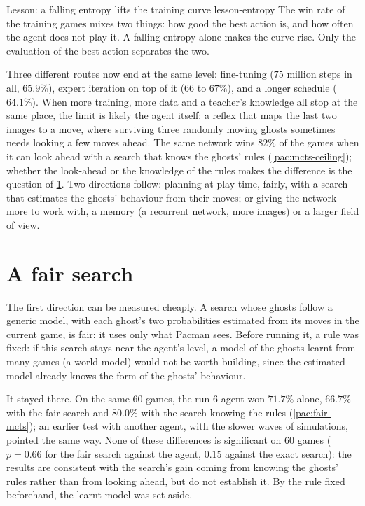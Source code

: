 \begin{remark}{Lesson: a falling entropy lifts the training curve}%
  {lesson-entropy}
  The win rate of the training games mixes two things: how good the best
  action is, and how often the agent does not play it. A falling entropy
  alone makes the curve rise. Only the evaluation of the best action
  separates the two.
\end{remark}

Three different routes now end at the same level: fine-tuning ($75$ million
steps in all, $65.9\%$), expert iteration on top of it ($66$ to $67\%$), and a
longer schedule ($64.1\%$). When more training, more data and a teacher's
knowledge all stop at the same place, the limit is likely the agent itself:
a reflex that maps the last two images to a move, where surviving three
randomly moving ghosts sometimes needs looking a few moves ahead. The same
network wins $82\%$ of the games when it can look ahead with a search
that knows the ghosts' rules (\cref{pac:mcts-ceiling}); whether the
look-ahead or the knowledge of the rules makes the difference is the
question of \cref{sec:v2-fair}.
Two directions follow: planning at play time, fairly, with a search that
estimates the ghosts' behaviour from their moves; or giving the network
more to work with, a memory (a recurrent network, more images) or a larger
field of view.

\section{A fair search}
\label{sec:v2-fair}

The first direction can be measured cheaply. A search whose ghosts follow a
generic model, with each ghost's two probabilities estimated from its moves
in the current game, is fair: it uses only what Pacman sees. Before running
it, a rule was fixed: if this search stays near the agent's level, a model
of the ghosts learnt from many games (a world model) would not be worth
building, since the estimated model already knows the form of the ghosts'
behaviour.

It stayed there. On the same $60$ games, the run-6 agent won $71.7\%$ alone,
$66.7\%$ with the fair search and $80.0\%$ with the search knowing the rules
(\cref{pac:fair-mcts}); an earlier test with another agent, with the
slower waves of simulations, pointed the same way. None of these
differences is significant on $60$ games ($p = 0.66$ for the fair search
against the agent, $0.15$ against the exact search): the results are
consistent with the search's gain coming from knowing the ghosts' rules
rather than from looking ahead, but do not establish it. By the rule
fixed beforehand, the learnt model was set aside.

